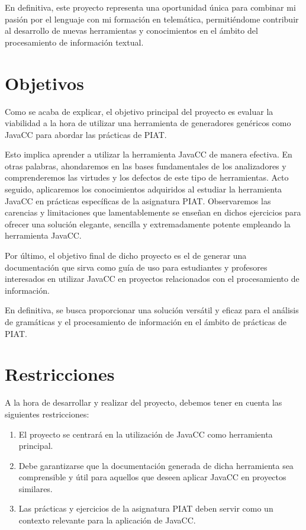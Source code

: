 En definitiva, este proyecto representa una oportunidad única para combinar mi pasión por el lenguaje con mi formación en telemática, permitiéndome contribuir al desarrollo de nuevas herramientas y conocimientos en el ámbito del procesamiento de información textual.

\section{Objetivos}

\noindent Como se acaba de explicar, el objetivo principal del proyecto es evaluar la viabilidad a la hora de utilizar una herramienta de generadores genéricos como JavaCC para abordar las prácticas de PIAT. 

Esto implica aprender a utilizar la herramienta JavaCC de manera efectiva. En otras palabras, ahondaremos en las bases fundamentales de los analizadores y comprenderemos las virtudes y los defectos de este tipo de herramientas. Acto seguido, aplicaremos los conocimientos adquiridos al estudiar la herramienta JavaCC en prácticas específicas de la asignatura PIAT. Observaremos las carencias y limitaciones que lamentablemente se enseñan en dichos ejercicios para ofrecer una solución elegante, sencilla y extremadamente potente empleando la herramienta JavaCC.


Por último, el objetivo final de dicho proyecto es el de generar una documentación que sirva como guía de uso para estudiantes y profesores interesados en utilizar JavaCC en proyectos relacionados con el procesamiento de información. 

En definitiva, se busca proporcionar una solución versátil y eficaz para el análisis de gramáticas y el procesamiento de información en el ámbito de prácticas de PIAT.

\section{Restricciones}

\noindent A la hora de desarrollar y realizar del proyecto, debemos tener en cuenta las siguientes restricciones:

\begin{enumerate}
    \item El proyecto se centrará en la utilización de JavaCC como herramienta principal. 
    \item Debe garantizarse que la documentación generada de dicha herramienta sea comprensible y útil para aquellos que deseen aplicar JavaCC en proyectos similares.
    \item Las prácticas y ejercicios de la asignatura PIAT deben servir como un contexto relevante para la aplicación de JavaCC.
\end{enumerate}

